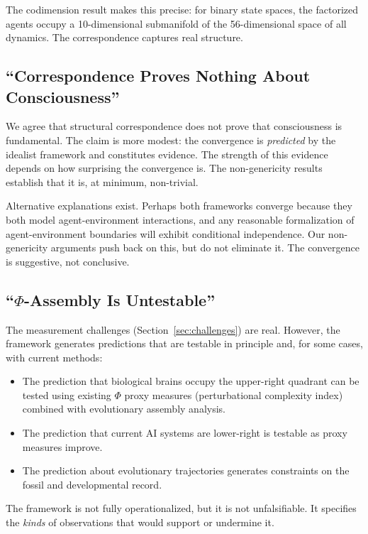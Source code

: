 \documentclass[11pt,a4paper]{article}
\theoremstyle{definition}
\theoremstyle{plain}
\theoremstyle{remark}
\begin{document}
The codimension result makes this precise: for binary state spaces, the factorized agents occupy a 10-dimensional submanifold of the 56-dimensional space of all dynamics. The correspondence captures real structure.

\subsection{``Correspondence Proves Nothing About Consciousness''}

We agree that structural correspondence does not prove that consciousness is fundamental. The claim is more modest: the convergence is \textit{predicted} by the idealist framework and constitutes evidence. The strength of this evidence depends on how surprising the convergence is. The non-genericity results establish that it is, at minimum, non-trivial.

Alternative explanations exist. Perhaps both frameworks converge because they both model agent-environment interactions, and any reasonable formalization of agent-environment boundaries will exhibit conditional independence. Our non-genericity arguments push back on this, but do not eliminate it. The convergence is suggestive, not conclusive.

\subsection{``$\Phi$-Assembly Is Untestable''}

The measurement challenges (Section~\ref{sec:challenges}) are real. However, the framework generates predictions that are testable in principle and, for some cases, with current methods:

\begin{itemize}
    \item The prediction that biological brains occupy the upper-right quadrant can be tested using existing $\Phi$ proxy measures (perturbational complexity index) combined with evolutionary assembly analysis.
    \item The prediction that current AI systems are lower-right is testable as proxy measures improve.
    \item The prediction about evolutionary trajectories generates constraints on the fossil and developmental record.
\end{itemize}

The framework is not fully operationalized, but it is not unfalsifiable. It specifies the \textit{kinds} of observations that would support or undermine it.
\end{document}
